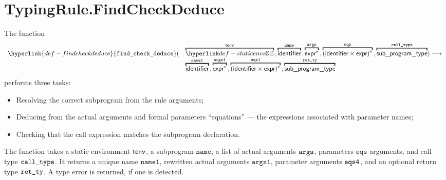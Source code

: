 \documentclass{book}
\newcommand\findcheckdeduce[0]{\hyperlink{def-findcheckdeduce}{\texttt{find\_check\_deduce}}}
\newcommand\eqs[0]{\texttt{eqs}}
\newcommand\nameone[0]{\texttt{name1}}
\newcommand\vargsone[0]{\texttt{args1}}
\newcommand\name[0]{\texttt{name}}
\begin{document}
\section{TypingRule.FindCheckDeduce \label{sec:TypingRule.FindCheckDeduce}}
\hypertarget{def-findcheckdeduce}{}
The function
\[
  \begin{array}{rl}
    \findcheckdeduce( &
      \overname{\staticenvs}{\tenv} \aslsep
      \overname{\identifier}{\name} \aslsep
      \overname{\expr^*}{\vargs} \aslsep
      \overname{(\identifier\times\expr)^*}{\eqs} \aslsep
      \overname{\subprogramtype}{\calltype}
     ) \aslto \\ &
    \overname{\identifier}{\nameone} \aslsep
    \overname{\expr^*}{\vargsone} \aslsep
    \overname{(\identifier\times\expr)^*}{\eqsone} \aslsep
    \overname{\subprogramtype}{\retty}
  \end{array}
\]
performs three tasks:
\begin{itemize}
  \item Resolving the correct subprogram from the rule arguments;
  \item Deducing from the actual arguments and formal parameters ``equations'' ---
  the expressions associated with parameter names;
  \item Checking that the call expression matches the subprogram declaration.
\end{itemize}
The function takes a static environment $\textsf{tenv}$, a subprogram $\name$,
a list of actual arguments $\texttt{args}$,
parameters $\eqs$ arguments, and call type $\texttt{call\_type}$.
It returns a unique name $\nameone$, rewritten actual arguments $\vargsone$,
parameter arguments $\texttt{eqs4}$, and an optional return type $\texttt{ret\_ty}$.
A type error is returned, if one is detected.
\end{document}
